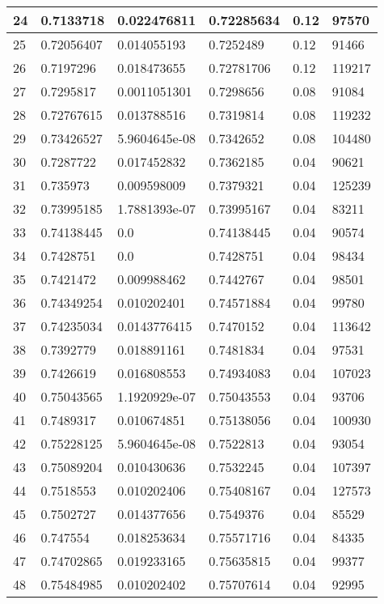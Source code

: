 \begin{longtable}{|l|l|l|l|l|l|}
24 & 0.7133718 & 0.022476811 & 0.72285634 & 0.12 & 97570 \\ \hline 
25 & 0.72056407 & 0.014055193 & 0.7252489 & 0.12 & 91466 \\ \hline 
26 & 0.7197296 & 0.018473655 & 0.72781706 & 0.12 & 119217 \\ \hline 
27 & 0.7295817 & 0.0011051301 & 0.7298656 & 0.08 & 91084 \\ \hline 
28 & 0.72767615 & 0.013788516 & 0.7319814 & 0.08 & 119232 \\ \hline 
29 & 0.73426527 & 5.9604645e-08 & 0.7342652 & 0.08 & 104480 \\ \hline 
30 & 0.7287722 & 0.017452832 & 0.7362185 & 0.04 & 90621 \\ \hline 
31 & 0.735973 & 0.009598009 & 0.7379321 & 0.04 & 125239 \\ \hline 
32 & 0.73995185 & 1.7881393e-07 & 0.73995167 & 0.04 & 83211 \\ \hline 
33 & 0.74138445 & 0.0 & 0.74138445 & 0.04 & 90574 \\ \hline 
34 & 0.7428751 & 0.0 & 0.7428751 & 0.04 & 98434 \\ \hline 
35 & 0.7421472 & 0.009988462 & 0.7442767 & 0.04 & 98501 \\ \hline 
36 & 0.74349254 & 0.010202401 & 0.74571884 & 0.04 & 99780 \\ \hline 
37 & 0.74235034 & 0.0143776415 & 0.7470152 & 0.04 & 113642 \\ \hline 
38 & 0.7392779 & 0.018891161 & 0.7481834 & 0.04 & 97531 \\ \hline 
39 & 0.7426619 & 0.016808553 & 0.74934083 & 0.04 & 107023 \\ \hline 
40 & 0.75043565 & 1.1920929e-07 & 0.75043553 & 0.04 & 93706 \\ \hline 
41 & 0.7489317 & 0.010674851 & 0.75138056 & 0.04 & 100930 \\ \hline 
42 & 0.75228125 & 5.9604645e-08 & 0.7522813 & 0.04 & 93054 \\ \hline 
43 & 0.75089204 & 0.010430636 & 0.7532245 & 0.04 & 107397 \\ \hline 
44 & 0.7518553 & 0.010202406 & 0.75408167 & 0.04 & 127573 \\ \hline 
45 & 0.7502727 & 0.014377656 & 0.7549376 & 0.04 & 85529 \\ \hline 
46 & 0.747554 & 0.018253634 & 0.75571716 & 0.04 & 84335 \\ \hline 
47 & 0.74702865 & 0.019233165 & 0.75635815 & 0.04 & 99377 \\ \hline 
48 & 0.75484985 & 0.010202402 & 0.75707614 & 0.04 & 92995 \\ \hline 

\end{longtable}

